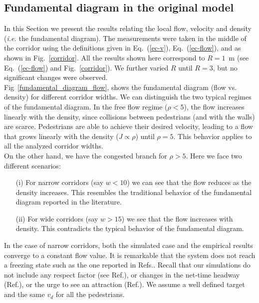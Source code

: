 \documentclass[preprint,12pt]{elsarticle}
\begin{document}
\subsection{\label{fundamental_diagram} Fundamental diagram in the original model}

In this Section we present the results relating the local flow, velocity and density (\textit{i.e.} the fundamental diagram). The measurements were taken in the middle of the corridor using the definitions given in Eq.~(\ref{ec-v}), Eq.~(\ref{ec-flow}), and as shown in Fig.~\ref{corridor}. All the results shown here correspond to $R=1$~m (see Eq.~(\ref{ec-flow}) and Fig.~\ref{corridor}). We further varied $R$ until $R=3$, but no significant changes were observed. \\

Fig~\ref{fundamental_diagram_flow}, shows the fundamental diagram (flow vs. density) for different corridor widths. We can distinguish the two typical regimes of the fundamental diagram. In the free flow regime ($\rho < 5$), the flow increases linearly with the density, since collisions between pedestrians (and with the walls) are scarce. Pedestrians are able to achieve their desired velocity, leading to a flow that grows linearly with the density ($J \propto \rho$) until $\rho=5$. This behavior applies to all the analyzed corridor widths.\\

On the other hand, we have the congested branch  for $\rho > 5$. Here we face two different scenarios:

\begin{itemize}
\item[(i)] For narrow corridors (say $w < 10$) we can see that the flow reduces as the density increases. This resembles the traditional behavior of the fundamental diagram reported in the literature. 
\item[(ii)] For wide corridors (say $w > 15$) we see that the flow increases with density. This contradicts the typical behavior of the fundamental diagram.   
\end{itemize}

In the case of narrow corridors, both the simulated case and the empirical results converge to a constant flow value. It is remarkable that the system does not reach a freezing state such as the one reported in Refs.\cite{kwak,lin}. Recall that our simulations do not include any respect factor (see Ref.\cite{parisi2}), or changes in the net-time headway (Ref.\cite{helbing3}), or the urge to see an attraction (Ref.\cite{kwak}). We assume a well defined target and the same $v_d$ for all the pedestrians.\\
\end{document}
